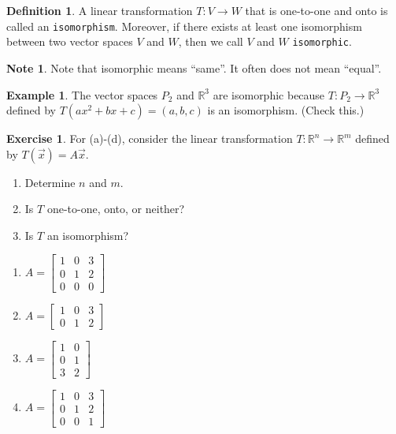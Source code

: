 \documentclass{beamer}
\newcommand{\R}{\mathbb{R}}
\newcommand{\fn}{\insertframenumber}
\theoremstyle{definition}
\newtheorem{exercise}{Exercise}
\newtheorem*{defn}{Definition}
\newtheorem*{exa}{Example}
\newtheorem*{nb}{Note}
\renewcommand{\emph}[1]{{\color{blue}\texttt{#1}}}
\begin{document}
\begin{frame}{\fn}
	\begin{defn}
		A linear transformation $T:V\to W$ that is one-to-one and onto is called an \emph{isomorphism}.  Moreover, if there exists at least one isomorphism between two vector spaces $V$ and $W$, then we call $V$ and $W$ \emph{isomorphic}.
	\end{defn}
	\begin{nb}
		Note that isomorphic means ``same''.  It often does not mean ``equal''.
	\end{nb}
	\begin{exa}
		The vector spaces $P_2$ and $\R^3$ are isomorphic because $T:P_2\to\R^3$ defined by $T(ax^2+bx+c)=(a,b,c)$ is an isomorphism.  (Check this.)
	\end{exa}
\end{frame}
\begin{frame}{\fn}
	\begin{exercise}
		For (a)-(d), consider the linear transformation $T:\R^n\to\R^m$ defined by $T(\vec x)=A\vec x$. 
			\begin{enumerate}[label=\roman*.]
				\item Determine $n$ and $m$.
				\item Is $T$ one-to-one, onto, or neither?
				\item Is $T$ an isomorphism?
			\end{enumerate} 
			\begin{multicols}{2}
				\begin{enumerate}[label=(\alph*)]
					\item $A=\begin{bmatrix}1&0&3\\0&1&2\\0&0&0\end{bmatrix}$
					\item $A=\begin{bmatrix}1&0&3\\0&1&2\end{bmatrix}$
					\item $A=\begin{bmatrix}1&0\\0&1\\3&2\end{bmatrix}$
					\item $A=\begin{bmatrix} 1&0&3\\0&1&2\\0&0&1\end{bmatrix}$
				\end{enumerate}
			\end{multicols}
	\end{exercise}
\end{frame}
\end{document}
